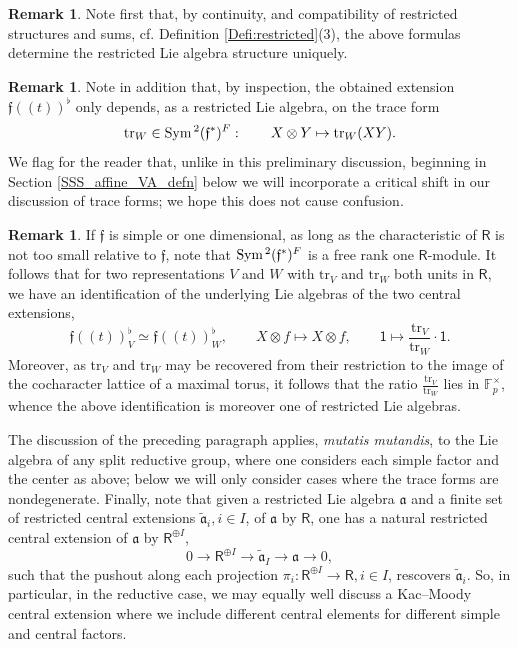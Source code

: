\documentclass{amsart}
\theoremstyle{definition}
\newtheorem{Rem}[Thm]{Remark}
\newcommand{\Sym}{\on{Sym}\hspace{.5mm}}
\newcommand{\on}{\mathrm}
\newcommand{\Ring}{\mathsf{R}}
\newcommand{\ff}{\mathfrak{f}}
\numberwithin{equation}{section}
\begin{document}
\begin{Rem}Note first that, by continuity, and compatibility of restricted structures and sums, cf. Definition \ref{Defi:restricted}(3), the above formulas determine the restricted Lie algebra structure uniquely.     
\end{Rem}


\begin{Rem} \label{r:traceforms} Note in addition that, by inspection, the obtained extension $\ff(\!(t)\!)^\flat$ only depends, as a restricted Lie algebra, on the trace form $$\on{tr}_W \in \Sym^2(\ff^*)^F: \quad \quad X \otimes Y \mapsto \on{tr}_W(XY).$$
We flag for the reader that, unlike in this preliminary discussion, beginning in Section \ref{SSS_affine_VA_defn} below we will incorporate a critical shift in our discussion of trace forms; we hope this does not cause confusion. 
\end{Rem}

\begin{Rem}\label{r:centext}If $\ff$ is simple or one dimensional, as long as the characteristic of $\Ring$ is not too small relative to $\ff$,  note that $\Sym^2(\ff^*)^F$ is a free rank one $\Ring$-module.  It follows that for two representations $V$ and $W$ with $\on{tr}_V$ and $\on{tr}_{W}$ both units in $\Ring$, we have an identification of the underlying Lie algebras of the two central extensions, 
$$ \ff(\!(t)\!)^\flat_V \simeq \ff(\!(t)\!)^\flat_W, \quad \quad X \otimes f \mapsto X \otimes f, 
  \quad \quad \mathsf{1} \mapsto  \frac{\on{tr}_{V}}{\on{tr}_{W}} \cdot \mathsf{1}.$$
Moreover, as $\on{tr}_V$ and $\on{tr}_W$ may be recovered from their restriction to the image of the cocharacter lattice of a maximal torus, it follows that the ratio $\frac{\on{tr}_V}{\on{tr}_W}$
lies in $\mathbb{F}_p^\times$,  whence the above identification is moreover one of restricted Lie algebras. 

The discussion of the preceding paragraph applies, {\em mutatis mutandis}, to the Lie algebra of any split reductive group, where one considers each simple factor and the center as above; below we will only consider cases where the trace forms are nondegenerate. Finally, note that given a restricted Lie algebra $\mathfrak{a}$ and a finite set of restricted central extensions $\widetilde{\mathfrak{a}}_i, i \in I$, of $\mathfrak{a}$ by $\Ring$, one has a natural restricted central extension of $\mathfrak{a}$ by $\Ring^{\oplus I}$, 
$$0 \rightarrow \Ring^{\oplus I} \rightarrow \widetilde{\mathfrak{a}}_I \rightarrow \mathfrak{a} \rightarrow 0,$$such that the pushout along each projection $\pi_i: \Ring^{\oplus I} \rightarrow \Ring, i \in I$, rescovers $\widetilde{\mathfrak{a}}_i$. So, in particular, in the reductive case, we may equally well discuss a Kac--Moody central extension where we include different central elements for different simple and central factors.  
\end{Rem}
\end{document}
